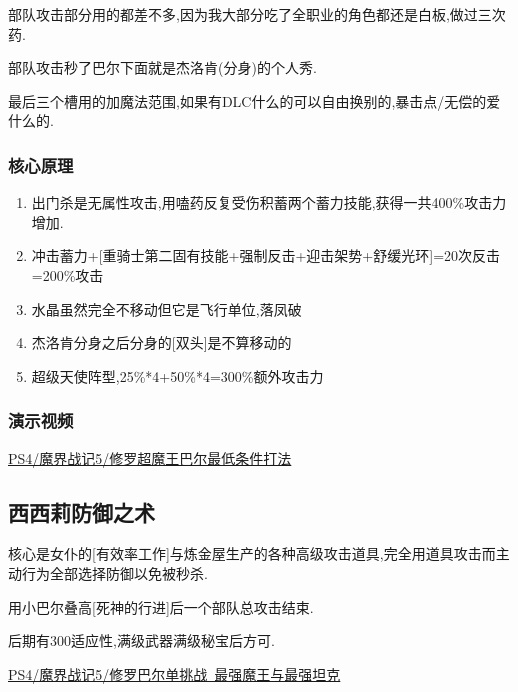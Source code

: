 	部队攻击部分用{\color{red}{大魔拳超魔流刷过全职业}}的都差不多,因为我大部分吃了全职业的角色都还是白板,做过三次药.

	部队攻击秒了巴尔下面就是杰洛肯(分身)的个人秀.

	最后三个槽用的加魔法范围,如果有DLC什么的可以自由换别的,暴击点/无偿的爱什么的.

	\newpage

	\subsubsection{核心原理}

	\begin{enumerate}
		\item 出门杀是无属性攻击,用嗑药反复受伤积蓄两个蓄力技能,获得一共400\%攻击力增加.

		\item 冲击蓄力+[重骑士第二固有技能+强制反击+迎击架势+舒缓光环]=20次反击=200\%攻击

		\item 水晶虽然完全不移动但它是飞行单位,落凤破

		\item 杰洛肯分身之后分身的[双头]是不算移动的
		
		\item 超级天使阵型,25\%*4+50\%*4=300\%额外攻击力
	\end{enumerate}

	\subsubsection{演示视频}

	\href{http://www.bilibili.com/video/av2976870/}{PS4/魔界战记5/修罗超魔王巴尔最低条件打法}

	\newpage

	\subsection{西西莉防御之术}

	核心是女仆的[有效率工作]与炼金屋生产的各种高级攻击道具,完全用道具攻击而主动行为全部选择防御以免被秒杀.

	用小巴尔叠高[死神的行进]后一个部队总攻击结束.

	后期有300适应性,满级武器满级秘宝后方可.

	\href{http://www.bilibili.com/video/av3465947/index_2.html}{PS4/魔界战记5/修罗巴尔单挑战~最强魔王与最强坦克}

	\newpage

